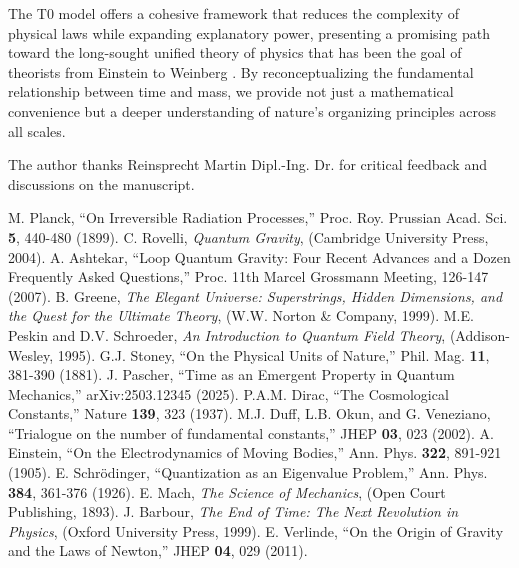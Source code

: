\documentclass[twocolumn,aps,prl]{revtex4-2}
\begin{document}
	The T0 model offers a cohesive framework that reduces the complexity of physical laws while expanding explanatory power, presenting a promising path toward the long-sought unified theory of physics that has been the goal of theorists from Einstein to Weinberg \cite{Weinberg1992}. By reconceptualizing the fundamental relationship between time and mass, we provide not just a mathematical convenience but a deeper understanding of nature’s organizing principles across all scales.
	
	\begin{acknowledgments}
		The author thanks Reinsprecht Martin Dipl.-Ing. Dr. for critical feedback and discussions on the manuscript.
	\end{acknowledgments}
	
	
	
	
	\begin{thebibliography}{99}
		 M. Planck, ``On Irreversible Radiation Processes,'' Proc. Roy. Prussian Acad. Sci. \textbf{5}, 440-480 (1899).
		 C. Rovelli, \textit{Quantum Gravity}, (Cambridge University Press, 2004).
		 A. Ashtekar, ``Loop Quantum Gravity: Four Recent Advances and a Dozen Frequently Asked Questions,'' Proc. 11th Marcel Grossmann Meeting, 126-147 (2007).
		 B. Greene, \textit{The Elegant Universe: Superstrings, Hidden Dimensions, and the Quest for the Ultimate Theory}, (W.W. Norton \& Company, 1999).
		 M.E. Peskin and D.V. Schroeder, \textit{An Introduction to Quantum Field Theory}, (Addison-Wesley, 1995).
		 G.J. Stoney, ``On the Physical Units of Nature,'' Phil. Mag. \textbf{11}, 381-390 (1881).
		 J. Pascher, ``Time as an Emergent Property in Quantum Mechanics,'' arXiv:2503.12345 (2025).
		 P.A.M. Dirac, ``The Cosmological Constants,'' Nature \textbf{139}, 323 (1937).
		 M.J. Duff, L.B. Okun, and G. Veneziano, ``Trialogue on the number of fundamental constants,'' JHEP \textbf{03}, 023 (2002).
		 A. Einstein, ``On the Electrodynamics of Moving Bodies,'' Ann. Phys. \textbf{322}, 891-921 (1905).
		 E. Schrödinger, ``Quantization as an Eigenvalue Problem,'' Ann. Phys. \textbf{384}, 361-376 (1926).
		 E. Mach, \textit{The Science of Mechanics}, (Open Court Publishing, 1893).
		 J. Barbour, \textit{The End of Time: The Next Revolution in Physics}, (Oxford University Press, 1999).
		 E. Verlinde, ``On the Origin of Gravity and the Laws of Newton,'' JHEP \textbf{04}, 029 (2011).

\end{thebibliography}
\end{document}
